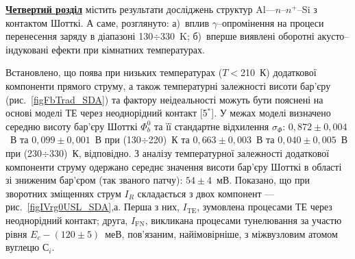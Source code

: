 

\underline{\textbf{Четвертий розділ}} містить результати досліджень структур Al---$n$--$n^+$--Si з контактом Шотткі.
А саме, розглянуто:
а)~вплив $\gamma$--опромінення на процеси перенесення заряду в діапазоні 130$\div$330~K;
б)~вперше виявлені оборотні акусто--індуковані ефекти при кімнатних температурах.
%

Встановлено, що поява при низьких температурах ($T\!<$210~К) додаткової компоненти прямого струму,
а також температурні залежності висоти бар'єру (рис.~\ref{figFbTrad_SDA}) та фактору неідеальності можуть бути пояснені
на основі моделі ТЕ через неоднорідний контакт
[5$^*$].
%
       У межах моделі визначено середню висоту бар'єру Шотткі $\Phi_b^0$ та її стандартне відхилення $\sigma_{\Phi}$:
       $0,872\pm0,004$~В та $0,099\pm0,001$~В при (130$\div$220)~К та
       $0,663\pm0,003$~В та $0,040\pm0,005$~В при (230$\div$330)~К, відповідно.
З аналізу температурної залежності додаткової компоненти струму одержано середнє значення висоти бар'єру Шотткі в області зі зниженим бар'єром (так званого патчу): $54\pm4$~мВ.
Показано, що при зворотних зміщеннях струм $I_R$ складається з двох компонент --- рис.~\ref{figIVrg0USL_SDA},а.
Перша з них, $I_\mathrm{TE}$, зумовлена процесами ТЕ через неоднорідний контакт;
друга,
$I_\mathrm{FN}$, викликана процесами тунелювання за участю
рівня $E_c-(120\pm5)$~меВ, пов'язаним, найімовірніше, з міжвузловим атомом вуглецю С$_i$.

